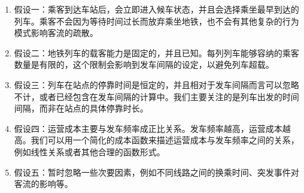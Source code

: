 \begin{enumerate}
    \item 假设一：乘客到达车站后，会立即进入候车状态，并且会选择乘坐最早到达的列车。乘客不会因为等待时间过长而放弃乘坐地铁，也不会有其他复杂的行为模式影响客流的疏散。
    \item 假设二：地铁列车的载客能力是固定的，并且已知。每列列车能够容纳的乘客数量是有限的，这个限制会影响到发车间隔的设定，以避免列车超载。
    \item 假设三：列车在站点的停靠时间是恒定的，并且相对于发车间隔而言可以忽略不计，或者已经包含在发车间隔的计算中。我们主要关注的是列车出发的时间间隔，而非在站点的具体停靠时长。
    \item 假设四：运营成本主要与发车频率成正比关系。发车频率越高，运营成本越高。我们可以用一个简化的成本函数来描述运营成本与发车频率之间的关系，例如线性关系或者其他合理的函数形式。
    \item 假设五：暂时忽略一些次要因素，例如不同线路之间的换乘时间、突发事件对客流的影响等。
\end{enumerate}



\begin{table}[ht]
    \centering

    \renewcommand\arraystretch{1.5}
    
\end{table}
